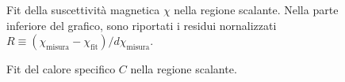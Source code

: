 \documentclass[a4paper,11pt]{article}
\begin{document}
	
	\begin{figure}
        \centering
		\caption{Fit della suscettività magnetica $\chi$ nella regione scalante. Nella parte inferiore del grafico, sono riportati i residui nornalizzati $R \equiv (\chi_{\text{misura}} - \chi_\text{fit})/d\chi_\text{misura}$.}
        \label{fig:chi_fit}
	\end{figure}

	\begin{figure}
        \centering
        \caption{Fit del calore specifico $C$ nella regione scalante.}
        \label{fig:C_fit}
	\end{figure}
	
\end{document}

